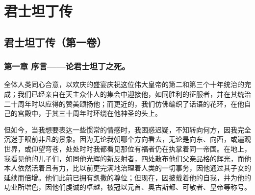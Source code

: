 
\chapter{君士坦丁传}


\newline{}\newline{}\newline{}\par



\section{君士坦丁传（第一卷）}


\subsection{第一章 序言——论君士坦丁之死。}

全体人类同心合意，以欢庆的盛宴庆祝这位伟大皇帝的第二和第三个十年统治的完成；我们已经亲自在天主众仆人的集会中迎接他，如同胜利的征服者，并在其统治二十周年时以应得的赞美颂扬他；而更近的，我们仿佛编织了话语的花环，在他自己的宫殿中，于其三十周年时环绕在他神圣的头上。\par

但如今，当我想要表达一些惯常的情感时，我困惑迟疑，不知转向何方，因我完全沉迷于眼前非凡的景象。因为无论我朝哪个方向看去，无论是向东、向西，或遍观世界，或仰望穹苍，处处时时我都看见那位有福者仍在执掌着同一帝国。在地上，我看见他的儿子们，如同他光辉的新反射者，四处散布他们父亲品格的辉光，而他本人依然活着且有力，比以前更完满地治理着人类的一切事务，因他通过其子女的延续而倍增。他们此前已拥有凯撒的尊位；但现在，因披戴着他的自我，并为他的功业所增色，因他们虔诚的卓越，被冠以元首、奥古斯都、可敬者、皇帝等称号。\par

